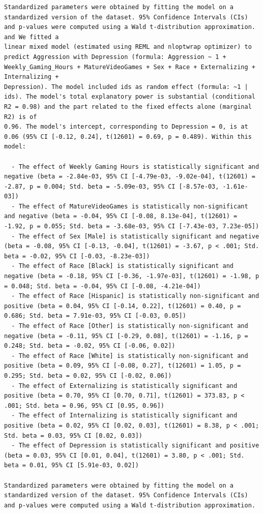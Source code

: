 \documentclass{article}
\begin{document}
\begin{verbatim}
Standardized parameters were obtained by fitting the model on a standardized version of the dataset. 95% Confidence Intervals (CIs) and p-values were computed using a Wald t-distribution approximation. and We fitted a
linear mixed model (estimated using REML and nloptwrap optimizer) to predict Aggression with Depression (formula: Aggression ~ 1 + Weekly_Gaming_Hours + MatureVideoGames + Sex + Race + Externalizing + Internalizing +
Depression). The model included ids as random effect (formula: ~1 | ids). The model's total explanatory power is substantial (conditional R2 = 0.98) and the part related to the fixed effects alone (marginal R2) is of
0.96. The model's intercept, corresponding to Depression = 0, is at 0.06 (95% CI [-0.12, 0.24], t(12601) = 0.69, p = 0.489). Within this model:

  - The effect of Weekly Gaming Hours is statistically significant and negative (beta = -2.84e-03, 95% CI [-4.79e-03, -9.02e-04], t(12601) = -2.87, p = 0.004; Std. beta = -5.09e-03, 95% CI [-8.57e-03, -1.61e-03])
  - The effect of MatureVideoGames is statistically non-significant and negative (beta = -0.04, 95% CI [-0.08, 8.13e-04], t(12601) = -1.92, p = 0.055; Std. beta = -3.68e-03, 95% CI [-7.43e-03, 7.23e-05])
  - The effect of Sex [Male] is statistically significant and negative (beta = -0.08, 95% CI [-0.13, -0.04], t(12601) = -3.67, p < .001; Std. beta = -0.02, 95% CI [-0.03, -8.23e-03])
  - The effect of Race [Black] is statistically significant and negative (beta = -0.18, 95% CI [-0.36, -1.97e-03], t(12601) = -1.98, p = 0.048; Std. beta = -0.04, 95% CI [-0.08, -4.21e-04])
  - The effect of Race [Hispanic] is statistically non-significant and positive (beta = 0.04, 95% CI [-0.14, 0.22], t(12601) = 0.40, p = 0.686; Std. beta = 7.91e-03, 95% CI [-0.03, 0.05])
  - The effect of Race [Other] is statistically non-significant and negative (beta = -0.11, 95% CI [-0.29, 0.08], t(12601) = -1.16, p = 0.248; Std. beta = -0.02, 95% CI [-0.06, 0.02])
  - The effect of Race [White] is statistically non-significant and positive (beta = 0.09, 95% CI [-0.08, 0.27], t(12601) = 1.05, p = 0.295; Std. beta = 0.02, 95% CI [-0.02, 0.06])
  - The effect of Externalizing is statistically significant and positive (beta = 0.70, 95% CI [0.70, 0.71], t(12601) = 373.83, p < .001; Std. beta = 0.96, 95% CI [0.95, 0.96])
  - The effect of Internalizing is statistically significant and positive (beta = 0.02, 95% CI [0.02, 0.03], t(12601) = 8.38, p < .001; Std. beta = 0.03, 95% CI [0.02, 0.03])
  - The effect of Depression is statistically significant and positive (beta = 0.03, 95% CI [0.01, 0.04], t(12601) = 3.80, p < .001; Std. beta = 0.01, 95% CI [5.91e-03, 0.02])

Standardized parameters were obtained by fitting the model on a standardized version of the dataset. 95% Confidence Intervals (CIs) and p-values were computed using a Wald t-distribution approximation.
\end{verbatim}
\end{document}
